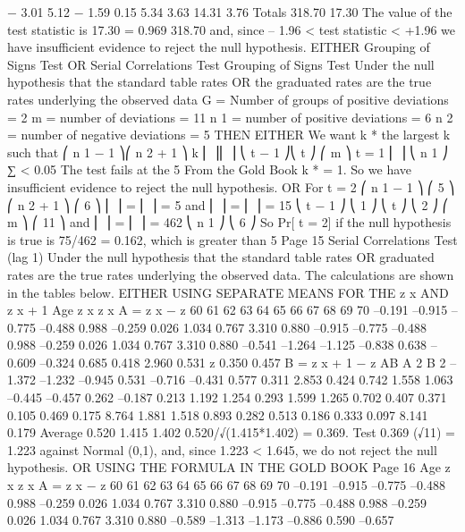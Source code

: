 \documentclass[a4paper,12pt]{article}
\begin{document}
\begin{enumerate}
− 3.01
5.12
− 1.59
0.15
5.34
3.63
14.31
3.76
Totals 318.70 17.30%
The value of the test statistic is
17.30
= 0.969
318.70
and, since – 1.96 < test statistic < +1.96 we have insufficient evidence to
reject the null hypothesis.
EITHER Grouping of Signs Test OR Serial Correlations Test
Grouping of Signs Test
Under the null hypothesis that the standard table rates OR the graduated rates
are the true rates underlying the observed data
G = Number of groups of positive deviations = 2
m = number of deviations = 11
n 1 = number of positive deviations = 6
n 2 = number of negative deviations = 5
THEN EITHER
We want k * the largest k such that
⎛ n 1 − 1 ⎞⎛ n 2 + 1 ⎞
k ⎜
⎟⎜
⎟
⎝ t − 1 ⎠⎝ t ⎠
⎛ m ⎞
t = 1
⎜ ⎟
⎝ n 1 ⎠
∑
< 0.05
The test fails at the 5%
From the Gold Book k * = 1.
So we have insufficient evidence to reject the null hypothesis.
OR
For t = 2
⎛ n 1 − 1 ⎞ ⎛ 5 ⎞
⎛ n 2 + 1 ⎞ ⎛ 6 ⎞
⎜
⎟ = ⎜ ⎟ = 5 and ⎜
⎟ = ⎜ ⎟ = 15
⎝ t − 1 ⎠ ⎝ 1 ⎠
⎝ t ⎠ ⎝ 2 ⎠
⎛ m ⎞ ⎛ 11 ⎞
and ⎜ ⎟ = ⎜ ⎟ = 462
⎝ n 1 ⎠ ⎝ 6 ⎠
So Pr[ t = 2] if the null hypothesis is true is 75/462 = 0.162, which is greater
than 5%
Page 15%
Serial Correlations Test (lag 1)
Under the null hypothesis that the standard table rates OR graduated
rates are the true rates underlying the observed data.
The calculations are shown in the tables below.
EITHER USING SEPARATE MEANS FOR THE z x AND z x + 1
Age z x z x A = z x − z
60
61
62
63
64
65
66
67
68
69
70 –0.191
–0.915
–0.775
–0.488
0.988
–0.259
0.026
1.034
0.767
3.310
0.880 –0.915
–0.775
–0.488
0.988
–0.259
0.026
1.034
0.767
3.310
0.880 –0.541
–1.264
–1.125
–0.838
0.638
–0.609
–0.324
0.685
0.418
2.960
0.531
z 0.350 0.457
B = z x + 1 − z
AB
A 2 B 2
–1.372
–1.232
–0.945
0.531
–0.716
–0.431
0.577
0.311
2.853
0.424 0.742
1.558
1.063
–0.445
–0.457
0.262
–0.187
0.213
1.192
1.254 0.293
1.599
1.265
0.702
0.407
0.371
0.105
0.469
0.175
8.764 1.881
1.518
0.893
0.282
0.513
0.186
0.333
0.097
8.141
0.179
Average 0.520 1.415 1.402
0.520/√(1.415*1.402) = 0.369.
Test 0.369 (√11) = 1.223 against Normal (0,1), and, since 1.223 < 1.645, we
do not reject the null hypothesis.
OR USING THE FORMULA IN THE GOLD BOOK
Page 16
Age z x z x A = z x − z
60
61
62
63
64
65
66
67
68
69
70 –0.191
–0.915
–0.775
–0.488
0.988
–0.259
0.026
1.034
0.767
3.310
0.880 –0.915
–0.775
–0.488
0.988
–0.259
0.026
1.034
0.767
3.310
0.880 –0.589
–1.313
–1.173
–0.886
0.590
–0.657

\end{enumerate}
\end{document}
